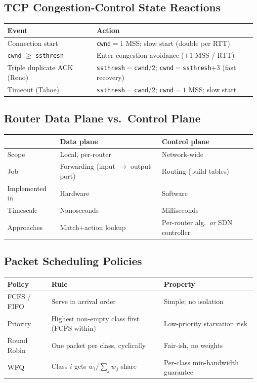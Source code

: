 \documentclass[hidelinks]{article}
\begin{document}
\subsection{TCP Congestion-Control State Reactions}

\noindent\begin{tabularx}{\textwidth}{|l|X|}
\hline
\textbf{Event} & \textbf{Action} \\
\hline
Connection start & \texttt{cwnd}$=1$ MSS; slow start (double per RTT) \\
\hline
\texttt{cwnd} $\geq$ \texttt{ssthresh} & Enter congestion avoidance ($+1$ MSS / RTT) \\
\hline
Triple duplicate ACK (Reno) & \texttt{ssthresh}$=$\texttt{cwnd}$/2$; \texttt{cwnd}$=$\texttt{ssthresh}$+3$ (fast recovery) \\
\hline
Timeout (Tahoe) & \texttt{ssthresh}$=$\texttt{cwnd}$/2$; \texttt{cwnd}$=1$ MSS; slow start \\
\hline
\end{tabularx}

\subsection{Router Data Plane vs.\ Control Plane}

\noindent\begin{tabularx}{\textwidth}{|l|X|X|}
\hline
 & \textbf{Data plane} & \textbf{Control plane} \\
\hline
Scope & Local, per-router & Network-wide \\
\hline
Job & Forwarding (input $\to$ output port) & Routing (build tables) \\
\hline
Implemented in & Hardware & Software \\
\hline
Timescale & Nanoseconds & Milliseconds \\
\hline
Approaches & Match+action lookup & Per-router alg.\ \emph{or} SDN controller \\
\hline
\end{tabularx}

\subsection{Packet Scheduling Policies}

\noindent\begin{tabularx}{\textwidth}{|l|X|X|}
\hline
\textbf{Policy} & \textbf{Rule} & \textbf{Property} \\
\hline
FCFS / FIFO & Serve in arrival order & Simple; no isolation \\
\hline
Priority & Highest non-empty class first (FCFS within) & Low-priority starvation risk \\
\hline
Round Robin & One packet per class, cyclically & Fair-ish, no weights \\
\hline
WFQ & Class $i$ gets $w_i/\sum_j w_j$ share & Per-class min-bandwidth guarantee \\
\hline
\end{tabularx}
\end{document}
